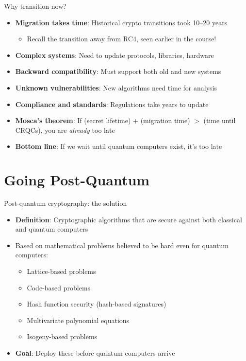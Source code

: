 \ifdefined\PRESENTATION\else\PassOptionsToClass{handout}{beamer}\fi\documentclass[aspectratio=169, lualatex]{beamer}
\begin{document}
\begin{frame}{Why transition now?}
	\begin{itemize}
		\item \textbf{Migration takes time}: Historical crypto transitions took 10--20 years
		      \begin{itemize}
			      \item Recall the transition away from RC4, seen earlier in the course!
		      \end{itemize}
		\item \textbf{Complex systems}: Need to update protocols, libraries, hardware
		\item \textbf{Backward compatibility}: Must support both old and new systems
		\item \textbf{Unknown vulnerabilities}: New algorithms need time for analysis
		\item \textbf{Compliance and standards}: Regulations take years to update
		\item \textbf{Mosca's theorem}: If (secret lifetime) + (migration time) $>$ (time until CRQCs), you are \textit{already} too late
		\item \textbf{Bottom line}: If we wait until quantum computers exist, it's too late
	\end{itemize}
\end{frame}

\section{Going Post-Quantum}

\begin{frame}{Post-quantum cryptography: the solution}
	\begin{itemize}
		\item \textbf{Definition}: Cryptographic algorithms that are secure against both classical and quantum computers
		\item Based on mathematical problems believed to be hard even for quantum computers:
		      \begin{itemize}
			      \item Lattice-based problems
			      \item Code-based problems
			      \item Hash function security (hash-based signatures)
			      \item Multivariate polynomial equations
			      \item Isogeny-based problems
		      \end{itemize}
		\item \textbf{Goal}: Deploy these before quantum computers arrive
	\end{itemize}
\end{frame}
\end{document}
